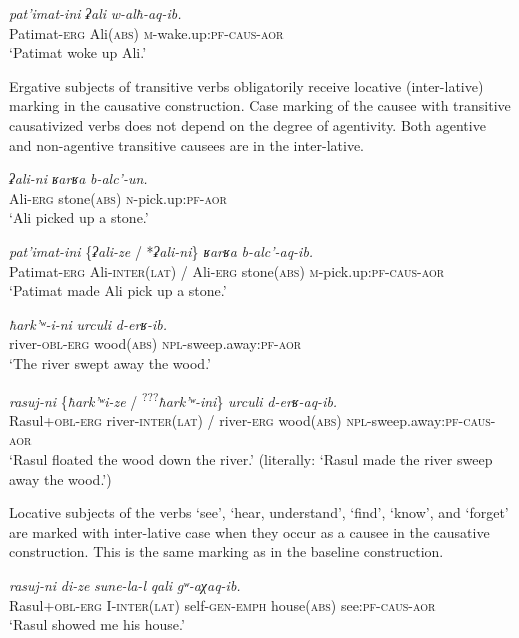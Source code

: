 ﻿\documentclass[output=paper]{langsci/langscibook}
\begin{document}
\ex %
\gll \emph{pat'imat-ini} \emph{ʡali} \emph{w-alħ-aq-ib.}\\
Patimat-\textsc{erg} Ali(\textsc{abs}) \textsc{m}-wake.up:\textsc{pf}-\textsc{caus}-\textsc{aor}\\
\glt `Patimat woke up Ali.'
\z
\z

Ergative subjects of transitive verbs obligatorily receive locative
(inter-lative) marking in the causative construction. Case marking of
the causee with transitive causativized verbs does not depend on the
degree of agentivity. Both agentive and non-agentive transitive causees
are in the inter-lative.

\ea %
\ea %
\gll \emph{ʡali-ni} \emph{ʁarʁa} \emph{b-alc'-un.}\\
Ali-\textsc{erg} stone(\textsc{abs}) \textsc{n}-pick.up:\textsc{pf}-\textsc{aor}\\
\glt `Ali picked up a stone.'

\ex %
\gll \emph{pat'imat-ini} \{\emph{ʡali-ze} / *\emph{ʡali-ni}\} \emph{ʁarʁa} \emph{b-alc'-aq-ib.}\\
Patimat-\textsc{erg} Ali-\textsc{inter(lat)} / Ali-\textsc{erg} stone(\textsc{abs}) \textsc{m}-pick.up:\textsc{pf}-\textsc{caus}-\textsc{aor}\\
\glt `Patimat made Ali pick up a stone.'
\z

\ex %
\ea %
\gll \emph{ħark'ʷ-i-ni} \emph{urculi} \emph{d-erʁ-ib.}\\
river-\textsc{obl}-\textsc{erg} wood(\textsc{abs}) \textsc{npl}-sweep.away:\textsc{pf}-\textsc{aor}\\
\glt `The river swept away the wood.'

\ex %
\gll \emph{rasuj-ni} \{\emph{ħark'ʷi-ze} / \textsuperscript{???}\emph{ħark'ʷ-ini}\} \emph{urculi} \emph{d-erʁ-aq-ib.}\\
Rasul+\textsc{obl}-\textsc{erg} river-\textsc{inter(lat)} / river-\textsc{erg} wood(\textsc{abs}) \textsc{npl}-sweep.away:\textsc{pf}-\textsc{caus}-\textsc{aor}\\
\glt `Rasul floated the wood down the river.' (literally: `Rasul made the river
sweep away the wood.')
\z
\z

Locative subjects of the verbs `see', `hear, understand', `find',
`know', and `forget' are marked with inter-lative case when they occur
as a causee in the causative construction. This is the same marking as in
the baseline construction.

\ea %
\gll \emph{rasuj-ni} \emph{di-ze} \emph{sune-la-l} \emph{qali} \emph{gʷ-aχaq-ib.}\\
Rasul+\textsc{obl}-\textsc{erg} I-\textsc{inter(lat)} self-\textsc{gen}-\textsc{emph} house(\textsc{abs}) see:\textsc{pf}-\textsc{caus}-\textsc{aor}\\
\glt `Rasul showed me his house.'
\end{document}
